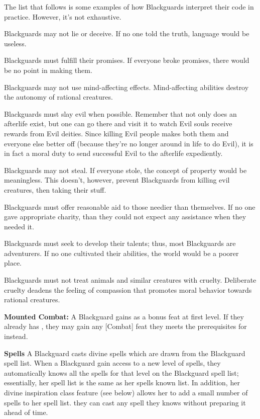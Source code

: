 The list that follows is some examples of how Blackguards interpret their code in practice. However, it's not exhaustive.
\begin{itemize*}
\item Blackguards may not lie or deceive. If no one told the truth, language would be useless.
\item Blackguards must fulfill their promises. If everyone broke promises, there would be no point in making them.
\item Blackguards may not use mind-affecting effects. Mind-affecting abilities destroy the autonomy of rational creatures.
\item Blackguards must slay evil when possible. Remember that not only does an afterlife exist, but one can go there and visit it to watch Evil souls receive rewards from Evil deities. Since killing Evil people makes both them and everyone else better off (because they're no longer around in life to do Evil), it is in fact a moral duty to send successful Evil to the afterlife expediently.
\item Blackguards may not steal. If everyone stole, the concept of property would be meaningless. This doesn't, however, prevent Blackguards from killing evil creatures, then taking their stuff.
\item Blackguards must offer reasonable aid to those needier than themselves. If no one gave appropriate charity, than they could not expect any assistance when they needed it.
\item Blackguards must seek to develop their talents; thus, most Blackguards are adventurers. If no one cultivated their abilities, the world would be a poorer place.
\item Blackguards must not treat animals and similar creatures with cruelty. Deliberate cruelty deadens the feeling of compassion that promotes moral behavior towards rational creatures.
\end{itemize*}

\textbf{Mounted Combat:} A Blackguard gains  as a bonus feat at first level. If they already has , they may gain any [Combat] feat they meets the prerequisites for instead.

\textbf{Spells} A Blackguard casts divine spells which are drawn from the Blackguard spell list. When a Blackguard gain access to a new level of spells, they automatically knows all the spells for that level on the Blackguard spell list; essentially, her spell list is the same as her spells known list. In addition, her divine inspiration class feature (see below) allows her to add a small number of spells to her spell list. they can cast any spell they knows without preparing it ahead of time.

